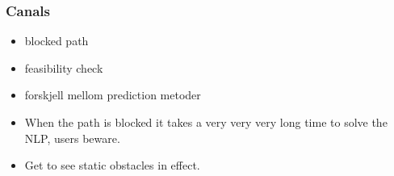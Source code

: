 \subsubsection{Canals}
\begin{itemize}
    \item blocked path
    \item feasibility check
    \item forskjell mellom prediction metoder
    \item When the path is blocked it takes a very very very long time to solve the NLP, users beware.
    \item Get to see static obstacles in effect.
\end{itemize}

